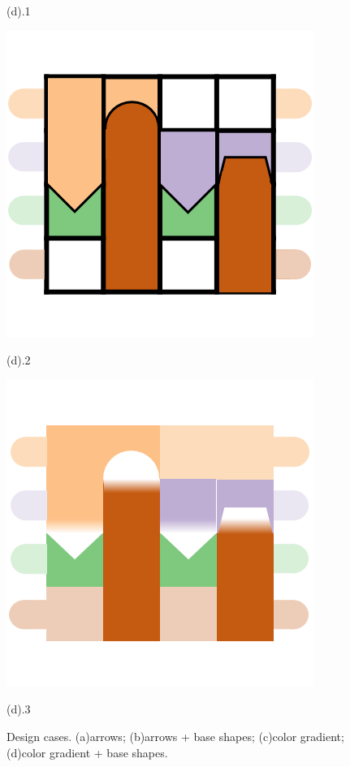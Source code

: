\begin{figure}[h]
\begin{minipage}{0.24\linewidth}
		\vspace{-1pt}
		\centerline{(d).1}
		\centerline{\includegraphics[width=\textwidth]{Fig/42.png}}
		\vspace{-1pt}
		\centerline{(d).2}
		\centerline{\includegraphics[width=\textwidth]{Fig/43.png}}
		\vspace{-1pt}
		\centerline{(d).3}
	\end{minipage}
	\caption{Design cases. (a)arrows; (b)arrows + base shapes; (c)color gradient; (d)color gradient + base shapes.}
	\label{fig:DC}
\end{figure}

